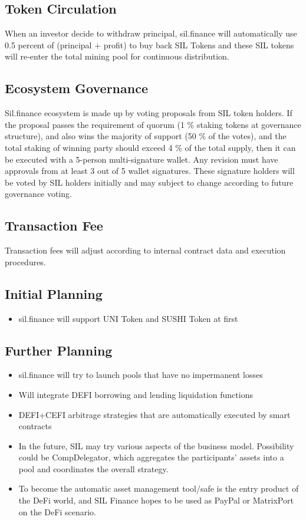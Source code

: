 \documentclass[11pt,letterpaper]{article}
\begin{document}
\begin{multicols}{2}
\subsection{Token Circulation}
When an investor decide to withdraw principal, sil.finance will automatically use 0.5 percent of (principal + profit) to buy back SIL Tokens and these SIL tokens will re-enter the total mining pool for continuous distribution.

\subsection{Ecosystem Governance}
Sil.finance ecosystem is made up by voting  proposals from SIL token holders. If the proposal passes the requirement of quorum (1 \% staking tokens at governance structure), and also wins the majority of support (50 \% of the votes), and the total staking of winning party should exceed 4 \% of the total supply, then it can be executed with a 5-person multi-signature wallet. Any revision must have approvals from at least 3 out of 5 wallet signatures. These signature holders will be voted by SIL holders initially and may subject to change according to future governance voting.

\subsection{Transaction Fee}
Transaction fees will adjust according to internal contract data and execution procedures.

\subsection{Initial Planning}
\begin{itemize}
  \item sil.finance will support UNI Token and SUSHI Token at first
\end{itemize}

\subsection{Further Planning}
\begin{itemize}
  \item sil.finance will try to launch pools that have no impermanent losses
  \item Will integrate DEFI borrowing and lending liquidation functions
  \item DEFI+CEFI arbitrage strategies that are automatically executed by smart contracts
  \item In the future, SIL may try various aspects of the business model. Possibility could be CompDelegator, which aggregates the participants’ assets into a pool and coordinates the overall strategy.
  \item To become the automatic asset management tool/safe is the entry product of the DeFi world, and SIL Finance hopes to be used as PayPal or MatrixPort on the DeFi scenario.
\end{itemize}


\end{multicols}
\end{document}
